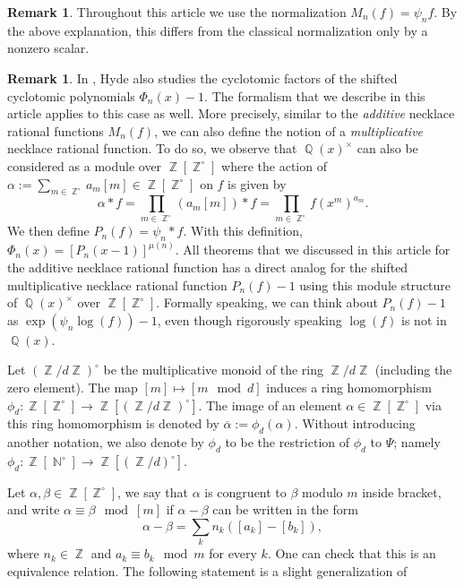 \documentclass[12t,a4paper]{amsart}
\theoremstyle{definition}
\newtheorem{rem}[thm]{Remark}
\DeclareMathOperator{\Z}{\mathbb{Z}}
\DeclareMathOperator{\N}{\mathbb{N}}
\DeclareMathOperator{\Q}{\mathbb{Q}}
\numberwithin{equation}{section}
\begin{document}
{\begin{rem}
Throughout this article we use the normalization \(M_n(f)=\psi_n f\). By the above explanation, this differs from the classical normalization only by a nonzero scalar.
\end{rem}


\begin{rem}
In \cite{hyde2022cyclotomic}, Hyde also studies the cyclotomic factors of the shifted cyclotomic polynomials $\Phi_n(x)-1.$ The formalism that we describe in this article applies to this case as well. More precisely, similar to the \textit{additive} necklace rational functions $M_n(f)$, we can also define the notion of a \textit{multiplicative} necklace rational function. To do so, we observe that $\Q(x)^{\times}$ can also be considered as a module over $\Z[\Z^{\circ}]$ where the action of $\alpha:=\sum_{m \in \Z^{\circ}} a_m [m]\in \Z[\Z^{\circ}]$ on $f$ is given by 
\[ \alpha*f  = \prod_{m \in \Z^{\circ}} (a_m[m])*f=  \prod_{m \in \Z^{\circ}} f(x^m)^{a_m}.\]
We then define $P_{n}(f) = \psi_n * f$. With this definition, $\Phi_n(x) = \left[P_n(x-1)\right]^{\mu(n)}$.  All theorems that we discussed in this article for the additive necklace rational function has a direct analog for the shifted multiplicative necklace rational function $P_n(f) -1$ using this module structure of $\Q(x)^{\times}$ over $\Z[\Z^{\circ}].$ Formally speaking, we can think about $P_n(f)-1$ as $\exp(\psi_n \log(f))-1$, even though rigorously speaking $\log(f)$ is not in $\Q(x)$.
\end{rem}





Let $(\Z/d\Z)^\circ$ be the multiplicative monoid of the ring $\Z/d\Z$ (including the zero element). The map $[m]\mapsto [m \mod d]$ induces a ring homomorphism $\phi_d\colon \Z[\Z^\circ]\to \Z[(\Z/d\Z)^\circ]$. The image of an element $\alpha\in \Z[\Z^\circ]$ via this ring homomorphism is denoted by $\overline{\alpha}:=\phi_d(\alpha)$. Without introducing another notation, we also denote by $\phi_d$ to be the restriction of $\phi_d$ to $\Psi$; namely $\phi_d: \Z[\N^{\circ}] \to \Z[(\Z/d)^{\circ}].$ 

Let $\alpha,\beta\in \Z[\Z^\circ]$, we say that $\alpha$ is congruent to $\beta$ modulo $m$ inside bracket, and write $\alpha\equiv\beta \mod [m]$ if 
$\alpha-\beta$ can be written in the form 
\[\alpha-\beta= \sum_k n_k([a_k]-[b_k]), \]
where $n_k\in \Z$ and $a_k\equiv b_k \mod m$ for every $k$. One can check that this is an equivalence relation. %
The following statement is a slight generalization of \cite[Corollary 4.2.2, part 1]{hyde2019polynomial}

}
\end{document}
